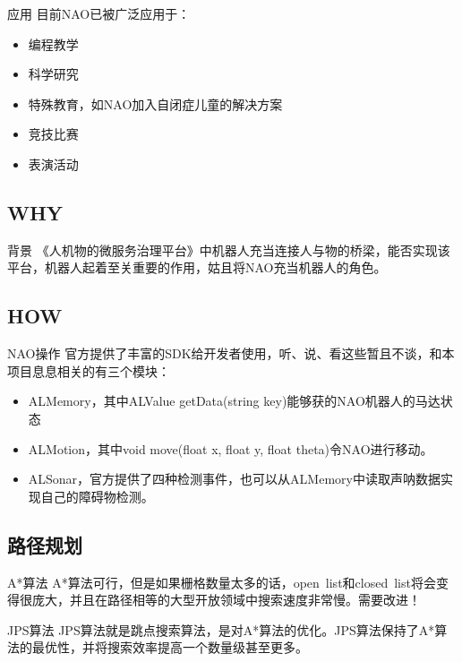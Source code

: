 \documentclass[notheorems, aspectratio=54]{beamer}
\begin{document}
\begin{frame}{应用}
    目前NAO已被广泛应用于：
    \begin{itemize}
        \item 编程教学
        \item 科学研究
        \item 特殊教育，如NAO加入自闭症儿童的解决方案
        \item 竞技比赛
        \item 表演活动
    \end{itemize}
\end{frame}

\subsection{WHY}
\begin{frame}{背景}
    《人机物的微服务治理平台》中机器人充当连接人与物的桥梁，能否实现该平台，机器人起着至关重要的作用，姑且将NAO充当机器人的角色。
\end{frame}

\subsection{HOW}
\begin{frame}{NAO操作}
    官方提供了丰富的SDK给开发者使用，听、说、看这些暂且不谈，和本项目息息相关的有三个模块：
    \begin{itemize}
        \item ALMemory，其中ALValue getData(string key)能够获的NAO机器人的马达状态
        \item ALMotion，其中void move(float x, float y, float theta)令NAO进行移动。
        \item ALSonar，官方提供了四种检测事件，也可以从ALMemory中读取声呐数据实现自己的障碍物检测。
    \end{itemize}
\end{frame}

\subsection{路径规划}
\begin{frame}{A*算法}
    A*算法可行，但是如果栅格数量太多的话，open\ list和closed\ list将会变得很庞大，并且在路径相等的大型开放领域中搜索速度非常慢。需要改进！
\end{frame}

\begin{frame}{JPS算法}
    JPS算法就是跳点搜索算法，是对A*算法的优化。JPS算法保持了A*算法的最优性，并将搜索效率提高一个数量级甚至更多。
\end{frame}
\end{document}
